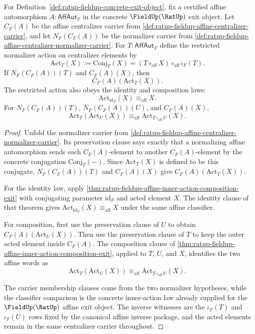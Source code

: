 \begin{theorem}
\label{thm:ratup-fieldup-affine-centralizer-normalizer-action}
For Definition~\ref{def:ratup-fieldup-concrete-exit-object}, fix a certified
affine automorphism $A:\mathsf{AffAut}_F$ in the concrete
$\FieldUp(\RatUp)$ exit object. Let $C_F(A)$ be the affine centralizer carrier
from \autoref{def:ratup-fieldup-affine-centralizer-carrier}, and let
$N_F(C_F(A))$ be the normalizer carrier from
\autoref{def:ratup-fieldup-affine-centralizer-normalizer-carrier}. For
$T:\mathsf{AffAut}_F$ define the restricted normalizer action on centralizer
elements by
$$
\mathrm{Act}_T(X):=\mathrm{Conj}_T(X)
=(T\circ_{\mathrm{aff}}X)\circ_{\mathrm{aff}}\iota_F(T).
$$
If $N_F(C_F(A))(T)$ and $C_F(A)(X)$, then
$$
C_F(A)(\mathrm{Act}_T(X)).
$$
The restricted action also obeys the identity and composition laws:
$$
\mathrm{Act}_{\mathrm{id}_F}(X)\equiv_{\mathrm{aff}}X.
$$
For $N_F(C_F(A))(T)$, $N_F(C_F(A))(U)$, and $C_F(A)(X)$,
$$
\mathrm{Act}_T(\mathrm{Act}_U(X))\equiv_{\mathrm{aff}}
\mathrm{Act}_{T\circ_{\mathrm{aff}}U}(X).
$$
\end{theorem}
\begin{proof}
Unfold the normalizer carrier from
\autoref{def:ratup-fieldup-affine-centralizer-normalizer-carrier}. Its
preservation clause says exactly that a normalizing affine automorphism sends
each $C_F(A)$-element to another $C_F(A)$-element by the concrete conjugation
$\mathrm{Conj}_T(-)$. Since $\mathrm{Act}_T(X)$ is defined to be this conjugate,
$N_F(C_F(A))(T)$ and $C_F(A)(X)$ give
$C_F(A)(\mathrm{Act}_T(X))$.

For the identity law, apply
\autoref{thm:ratup-fieldup-affine-inner-action-composition-exit} with
conjugating parameter $\mathrm{id}_F$ and acted element $X$. The identity clause
of that theorem gives
$\mathrm{Act}_{\mathrm{id}_F}(X)\equiv_{\mathrm{aff}}X$ under the same affine
classifier.

For composition, first use the preservation clause of $U$ to obtain
$C_F(A)(\mathrm{Act}_U(X))$. Then use the preservation clause of $T$ to keep the
outer acted element inside $C_F(A)$. The composition clause of
\autoref{thm:ratup-fieldup-affine-inner-action-composition-exit}, applied to
$T$, $U$, and $X$, identifies the two affine words as
$$
\mathrm{Act}_T(\mathrm{Act}_U(X))\equiv_{\mathrm{aff}}
\mathrm{Act}_{T\circ_{\mathrm{aff}}U}(X).
$$

The carrier membership clauses come from the two normalizer hypotheses, while
the classifier comparison is the concrete inner-action law already supplied for
the $\FieldUp(\RatUp)$ affine exit object. The inverse witnesses are the
$\iota_F(T)$ and $\iota_F(U)$ rows fixed by the canonical affine inverse
package, and the acted elements remain in the same centralizer carrier
throughout.
\end{proof}

